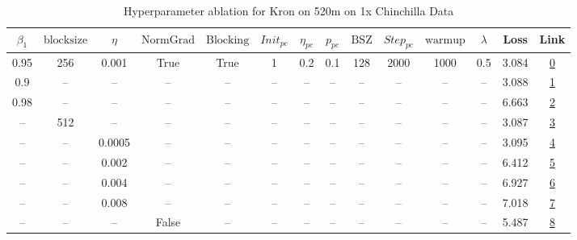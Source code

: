 \begin{table}[H]
\centering
\caption{Hyperparameter ablation for Kron on 520m on 1x Chinchilla Data}
\label{tab:ablation_kron_520m_1}
\begin{tabular}{cccccccccccccc}
\toprule
$\beta_1$ & $\mathrm{block size}$ & $\eta$ & $\mathrm{NormGrad}$ & $\mathrm{Blocking}$ & $Init_{pc}$ & $\eta_{pc}$ & $p_{pc}$ & $\mathrm{BSZ}$ & $Step_{pc}$ & $\mathrm{warmup}$ & $\lambda$ & Loss & Link \\
\midrule
0.95 & 256 & 0.001 & True & True & 1 & 0.2 & 0.1 & 128 & 2000 & 1000 & 0.5 & 3.084 & \href{https://wandb.ai/stanford-mercury/optimizer-scaling/runs/sweep-520m-10B-kronb99966lr0.001-wd0.5-b10.95-plr0.2-pis1-gn1-no-99dc7c}{0} \\
\midrule
0.9 & -- & -- & -- & -- & -- & -- & -- & -- & -- & -- & -- & 3.088 & \href{https://wandb.ai/stanford-mercury/optimizer-scaling/runs/sweep-520m-10B-kron8de5balr0.001-wd0.5-b10.9-plr0.2-pis1-gn1-nor-bd8414}{1} \\
0.98 & -- & -- & -- & -- & -- & -- & -- & -- & -- & -- & -- & 6.663 & \href{https://wandb.ai/stanford-mercury/optimizer-scaling/runs/sweep-520m-10B-kron40f5fdlr0.001-wd0.5-b10.98-plr0.2-pis1-gn1-no-d16344}{2} \\
-- & 512 & -- & -- & -- & -- & -- & -- & -- & -- & -- & -- & 3.087 & \href{https://wandb.ai/stanford-mercury/optimizer-scaling/runs/sweep-520m-10B-kronb561bdlr0.001-wd0.5-b10.95-plr0.2-pis1-gn1-no-1c08ad}{3} \\
-- & -- & 0.0005 & -- & -- & -- & -- & -- & -- & -- & -- & -- & 3.095 & \href{https://wandb.ai/stanford-mercury/optimizer-scaling/runs/sweep-520m-10B-krondf7ba9lr0.0005-wd0.5-b10.95-plr0.2-pis1-gn1-n-d65d46}{4} \\
-- & -- & 0.002 & -- & -- & -- & -- & -- & -- & -- & -- & -- & 6.412 & \href{https://wandb.ai/stanford-mercury/optimizer-scaling/runs/sweep-520m-10B-kron5b495flr0.002-wd0.5-b10.95-plr0.2-pis1-gn1-no-c64c4f}{5} \\
-- & -- & 0.004 & -- & -- & -- & -- & -- & -- & -- & -- & -- & 6.927 & \href{https://wandb.ai/stanford-mercury/optimizer-scaling/runs/sweep-520m-10B-kron6d4a78lr0.004-wd0.5-b10.95-plr0.2-pis1-gn1-no-018cac}{6} \\
-- & -- & 0.008 & -- & -- & -- & -- & -- & -- & -- & -- & -- & 7.018 & \href{https://wandb.ai/stanford-mercury/optimizer-scaling/runs/sweep-520m-10B-kron93bd52lr0.008-wd0.5-b10.95-plr0.2-pis1-gn1-no-a3a0f8}{7} \\
-- & -- & -- & False & -- & -- & -- & -- & -- & -- & -- & -- & 5.487 & \href{https://wandb.ai/stanford-mercury/optimizer-scaling/runs/sweep-520m-10B-kronb8e354lr0.001-wd0.5-b10.95-plr0.2-pis1-gn1-no-928921}{8} \\

\end{tabular}
\end{table}
